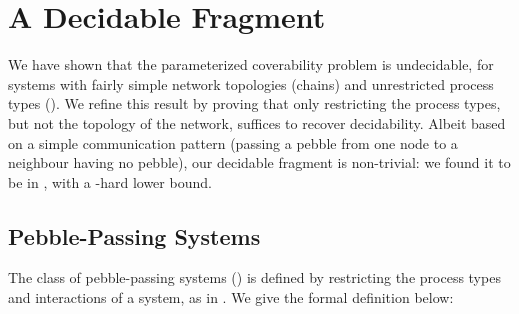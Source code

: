 
\newcommand{\tcount}[2]{\#_{#1}(#2)}
\newcommand{\fromcount}[2]{\tcount{{#1}\to}{#2}}
\newcommand{\tocount}[2]{\tcount{\to{#1}}{#2}}

\section{A Decidable Fragment}
\label{sec:pebble-passing}

We have shown that the parameterized coverability problem is
undecidable, for systems with fairly simple network topologies
(chains) and unrestricted process types
(). We refine this result by proving that
only restricting the process types, but not the topology of the
network, suffices to recover decidability. Albeit based on a simple
communication pattern (\ie passing a pebble from one node to a
neighbour having no pebble), our decidable fragment is non-trivial: we
found it to be in \twoexptime, with a \pspace-hard lower bound.
 

\subsection{Pebble-Passing Systems}

The class of pebble-passing systems (\ppstext) is defined by restricting
the process types and interactions of a system, as in
. We give the formal definition below:

